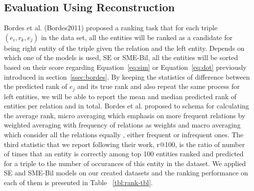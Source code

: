 \subsection{Evaluation Using Reconstruction}
\label{ssec:ent-link-intrinsic}

Bordes et al. (Bordes2011) proposed a ranking task that for each triple $(e_{i} , r_{k}, e_{j} )$ in the data set,
 all the entities will be ranked as a candidate for being right entity of the triple 
 given the relation and the left entity. Depends on which one of the models is used, SE or SME-Bil, all the entities will be sorted
  based on their score regarding Equation~\eqref{eq:sim} or Equation~\ref{eq:dot} previously introduced in section~\ref{ssec:bordes}. 
  By keeping the statistics of difference between the predicted rank of $e_{j}$ and its true rank and also repeat the same process
  for left entities, we will be able to report the mean and median predicted rank of entities per relation and in total. Bordes et al.
   proposed to schema for calculating the average rank, micro averaging which emphasis on more frequent relations by
    weighted averaging with frequency of relations as weights and macro averaging which consider all the relations equally
    , either frequent or infrequent ones. The third statistic that we report following their work, r@100, is the ratio of number of times that 
    an entity is correctly among top 100 entities ranked and predicted for a triple to the number of occurances of this entity in the dataset.
    We applied SE and SME-Bil models on our created datasets and the ranking performance on each of them is presented in Table ~\ref{tbl:rank-tbl}.
	
